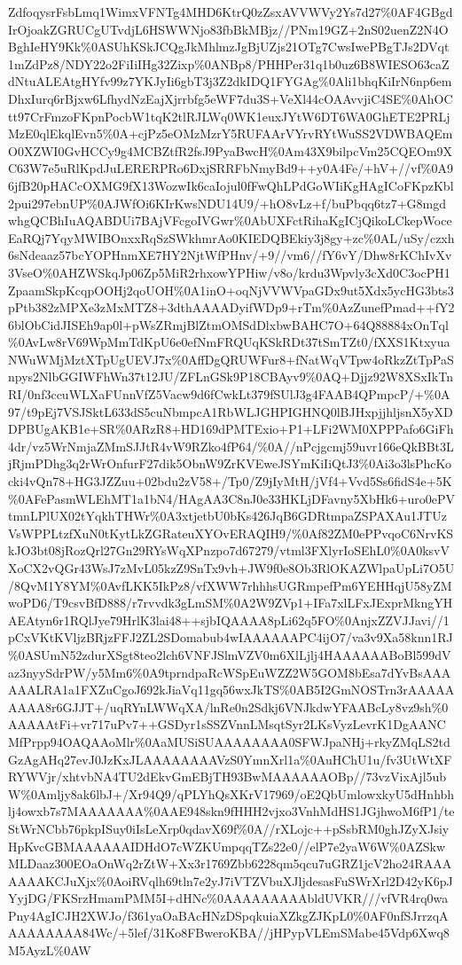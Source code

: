 \documentclass[]{article}
\begin{document}
ZdfoqysrFsbLmq1WimxVFNTg4MHD6KtrQ0zZsxAVVWVy2Ys7d27\%0AF4GBgdIrOjoakZGRUCgUTvdjL6HSWWNjo83fbBkMBjz//PNm19GZ+2nS02uenZ2N4OBghIeHY9Kk\%0ASUhKSkJCQgJkMhlmzJgBjUZjs21OTg7CwsIwePBgTJs2DVqt1mZdPz8/NDY22o2FiIiIHg32Zixp\%0ANBp8/PHHPer31q1b0uz6B8WIESO63caZdNtuALEAtgHYfv99z7YKJyIi6gbT3j3Z2dkIDQ1FYGAg\%0Ali1bhqKiIrN6np6emDhxIurq6rBjxw6LfhydNzEajXjrrbfg5eWF7du3S+VeXl44cOAAvvjiC4SE\%0AhOCtt97CrFmzoFKpnPocbW1tqK2tlRJLWq0WK1euxJYtW6DT6WA0GhETE2PRLjMzE0qlEkqlEvn5\%0A+cjPz5eOMzMzrY5RUFAArVYrvRYtWuSS2VDWBAQEmO0XZWI0GvHCCy9g4MCBZtfR2fsJ9PyaBwcH\%0Am43X9bilpcVm25CQEOm9XC63W7e5uRlKpdJuLERERPRo6DxjSRRFbNmyBd9++y0A4Fe/+hV+//vf\%0A96jfB20pHACcOXMG9fX13WozwIk6caIojul0fFwQhLPdGoWIiKgHAgICoFKpzKbl2pui297ebnUP\%0AJWfOi6KIrKwsNDU14U9/+hO8vLz+f/buPbqq6tz7+G8mgdwhgQCBhIuAQABDUi7BAjVFcgoIVGwr\%0AbUXFctRihaKgICjQikoLCkepWoceEaRQj7YqyMWIBOnxxRqSzSWkhmrAo0KIEDQBEkiy3j8gy+zc\%0AL/uSy/czxh6sNdeaaz57bcYOPHnmXE7HY2NjtWfPHnv/+9//vm6//fY6vY/Dhw8rKChIvXv3VseO\%0AHZWSkqJp06Zp5MiR2rhxowYPHiw/v8o/krdu3Wpvly3cXd0C3ocPH1ZpaamSkpKcqpOOHj2qoUOH\%0A1inO+oqNjVVWVpaGDx9ut5Xdx5ycHG3bts3pPtb382zMPXe3zMxMTZ8+3dthAAAADyifWDp9+rTm\%0AzZunefPmad++fY26blObCidJISEh9ap0l+pWsZRmjBlZtmOMSdDlxbwBAHC7O+64Q88884xOnTql\%0AvLw8rV69WpMmTdKpU6e0efNmFRQUqKSkRDt37tSmTZt0/fXXS1KtxyuaNWuWMjMztXTpUgUEVJ7x\%0AffDgQRUWFur8+fNatWqVTpw4oRkzZtTpPaSnpys2NlbGGIWFhWn37t12JU/ZFLnGSk9P18CBAyv9\%0AQ+Djjz92W8XSxIkTnRI/0nf3ccuWLXaFUnnVfZ5Vacw9d6fCwkLt379fSUlJ3g4FAAB4QPmpcP/+\%0A97/t9pEj7VSJSktL633dS5cuNbmpcA1RbWLJGHPIGHNQ0lBJHxpjjhljsnX5yXDDPBUgAKB1e+SR\%0ARzR8+HD169dPMTExio+P1+LFi2WM0XPPPafo6GiFh4dr/vz5WrNmjaZMmSJJtR4vW9RZko4fP64/\%0A//nPcjgcmj59uvr166eQkBBt3LjRjmPDhg3q2rWrOnfurF27dik5ObnW9ZrKVEweJSYmKiIiQtJ3\%0Ai3o3lsPhcKocki4vQn78+HG3JZZuu+02bdu2zV58+/Tp0/Z9jIyMtH/jVf4+Vvd5Ss6fidS4e+5K\%0AFePasmWLEhMT1a1bN4/HAgAA3C8nJ0e33HKLjDFavny5XbHk6+uro0ePVtmnLPlUX02tYqkhTHWr\%0A3xtjetbU0bKs426JqB6GDRtmpaZSPAXAu1JTUzVsWPPLtzfXuN0tKytLkZGRateuXYOvERAQIH9/\%0Af82ZM0ePPvqoC6NrvKSkJO3bt08jRozQrl27Gn29RYsWqXPnzpo7d67279/vtml3FXlyrIoSEhL0\%0A0ksvVXoCX2vQGr43WsJ7zMvL05kzZ9SnTx9vh+JW9f0e8Ob3RlOKAZWlpaUpLi7O5U/8QvM1Y8YM\%0AvfLKK5IkPz8/vfXWW7rhhhsUGRmpefPm6YEHHqjU58yZMwoPD6/T9csvBfD888/r7rvvdk3gLmSM\%0A2W9ZVp1+IFa7xlLFxJExprMkngYHAEAtyn6r1RQlJye79HrlK3lai48++sjbIQAAAA8pLi62q5FO\%0AnjxZZVJJavi//1pCxVKtKVljzBRjzFFJ2ZL2SDomabub4wIAAAAAAPC4ijO7/va3v9Xa58knn1RJ\%0ASUmN52zdurXSgt8teo2lch6VNFJSlmVZV0m6XlLjlj4HAAAAAABoBl599dVaz3nyySdrPW/y5Mm6\%0A9tprndpaRcWSpEuWZZ2W5GOM8bEsa7dYvBsAAAAAALRA1a1FXZuCgoJ692kJiaVq11gq56wxJkTS\%0AB5I2GmNOSTrn3rAAAAAAAAA8r6GJJT+/uqRYnLWWqXA/lnRe0n2Sdkj6VNJkdwYFAABcLy8vz9sh\%0AAAAAtFi+vr717uPv7++GSDyr1sSSZVnnLMsqtSyr2LKsVyzLevrK1DgAANCMfPrpp94OAQAAoMlr\%0AaMUSiSUAAAAAAAA0SFWJpaNHj+rkyZMqLS2tdGzAgAHq27evJ0JzKxJLAAAAAAAAVzS0YmnXrl1a\%0AuHChU1u/fv3UtWtXFRYWVjr/xhtvbNA4TU2dEkvGmEBjTH93BwMAAAAAAOBp//73vzVixAjl5ubW\%0Amljy8ak6lbJ+/Xr94Q9/qPLYhQsXKrV17969/oE2QbUmlowxkyU5dHnhbhlj4owxb7s7MAAAAAAA\%0AAE948skn9fHHH2vjxo3VnhMdHS1JGjhwoM6fP1/teStWrNCbb76pkpISuy0iIsLeXrp0qdavX69f\%0A//rXLojc++pSsbRM0ghJZyXJsiyHpKvcGBMAAAAAAIDHdO7cWZKUmpqqTZs22e0//elP7e2yaW6W\%0AZSkwMLDaaz300EOaOnWq2rZtW+Xx3r1769Zbb6228qm5qcu7uGRZ1jcV2ho24RAAAAAAAKCJuXjx\%0AoiRVqlh69tln7e2yJ7iVTZVbuXJljdesasFuSWrXrl2D42yK6pJYyjDG/FKSrzHmamPMM5I+dHNc\%0AAAAAAAAAbldUVKR///vfVR4rq0waPny4AgICJH2XWJo/f361yaOaBAcHNzDSpqkuiaXZkgZJKpL0\%0AF0nfSJrrzqAAAAAAAAA84Wc/+5lef/31Ko8FBweroKBA//jHPypVLEmSMabe45Vdp6Xwq8M5AyzL\%0AW
\end{document}
